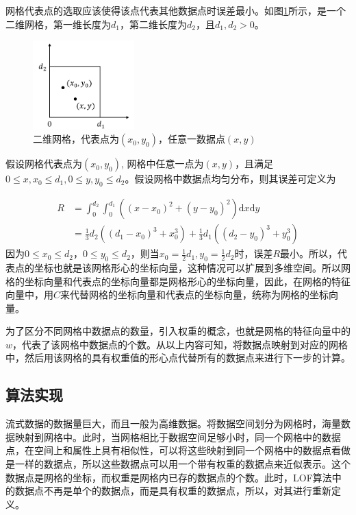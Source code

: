 网格代表点的选取应该使得该点代表其他数据点时误差最小。如图\ref{fig:fig36}所示，是一个二维网格，第一维长度为$d_1$，第二维长度为$d_2$，且$d_1, d_2 >0$。

\begin{figure}[htb]
	\centering
	\includegraphics[width=0.35\textwidth]{figures/figure3x6}
	\caption{二维网格，代表点为$\left ( x_{0},y_{0} \right )$，任意一数据点$(x,y)$}\label{fig:fig36}
\end{figure}

假设网格代表点为$\left ( x_{0},y_{0} \right )$, 网格中任意一点为$(x,y)$，且满足$0\leq x,x_0\leq d_1, 0\leq y,y_0\leq d_2$。假设网格中数据点均匀分布，则其误差可定义为

\begin{equation}
\begin{split}
R &=\int_{0}^{d_2}\int_{0}^{d_1}\left ( \left ( x-x_0 \right )^2 + \left ( y-y_0 \right )^2 \right )\mathrm{d} x\mathrm{d} y \\
&=\frac{1}{3}d_2\left ( \left ( d_1-x_0 \right )^3+x_{0}^{3} \right )+\frac{1}{3}d_1\left ( \left ( d_2-y_0 \right )^3+y_{0}^{3} \right )
\end{split}
\end{equation}
因为$0\leq x_0\leq d_2$，$0\leq y_0\leq d_2$，则当$x_0=\frac{1}{2}d_1, y_0=\frac{1}{2}d_2$时，误差$R$最小。所以，代表点的坐标也就是该网格形心的坐标向量，这种情况可以扩展到多维空间。所以网格的坐标向量和代表点的坐标向量都是网格形心的坐标向量，因此，在网格的特征向量中，用$C$来代替网格的坐标向量和代表点的坐标向量，统称为网格的坐标向量。

为了区分不同网格中数据点的数量，引入权重的概念，也就是网格的特征向量中的$w$，代表了该网格中数据点的个数。从以上内容可知，将数据点映射到对应的网格中，然后用该网格的具有权重值的形心点代替所有的数据点来进行下一步的计算。

\subsection{算法实现}
流式数据的数据量巨大，而且一般为高维数据。将数据空间划分为网格时，海量数据映射到网格中。此时，当网格相比于数据空间足够小时，同一个网格中的数据点，在空间上和属性上具有相似性，可以将这些映射到同一个网格中的数据点看做是一样的数据点，所以这些数据点可以用一个带有权重的数据点来近似表示。这个数据点是网格的坐标，而权重是网格内已存的数据点的个数。此时，LOF算法中的数据点不再是单个的数据点，而是具有权重的数据点，所以，对其进行重新定义。

